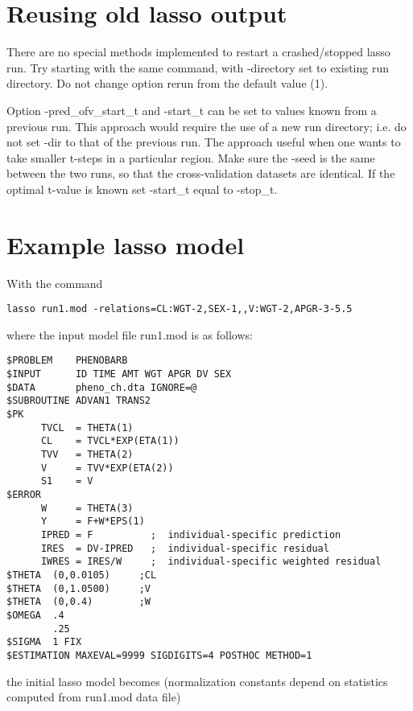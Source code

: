 \section{Reusing old lasso output}

There are no special methods implemented to restart a crashed/stopped lasso run. Try starting with the same command, with -directory set to existing run directory. Do not change option rerun from the default value (1).

Option -pred\_ofv\_start\_t and -start\_t can be set to values known from a previous run. This approach would require the use of a new run directory; i.e. do not set -dir to that of the previous run. The approach useful when one wants to take smaller t-steps in a particular region. Make sure the -seed is the same between the two runs, so that the cross-validation datasets are identical. If the optimal t-value is known set -start\_t equal to -stop\_t. 

\section{Example lasso model}

With the command
\begin{verbatim}
lasso run1.mod -relations=CL:WGT-2,SEX-1,,V:WGT-2,APGR-3-5.5
\end{verbatim}

where the input model file run1.mod is as follows:

\begin{verbatim}
$PROBLEM    PHENOBARB 
$INPUT      ID TIME AMT WGT APGR DV SEX
$DATA       pheno_ch.dta IGNORE=@
$SUBROUTINE ADVAN1 TRANS2
$PK
      TVCL  = THETA(1)
      CL    = TVCL*EXP(ETA(1))
      TVV   = THETA(2)
      V     = TVV*EXP(ETA(2))
      S1    = V
$ERROR      
      W     = THETA(3)
      Y     = F+W*EPS(1)
      IPRED = F          ;  individual-specific prediction
      IRES  = DV-IPRED   ;  individual-specific residual
      IWRES = IRES/W     ;  individual-specific weighted residual
$THETA  (0,0.0105)     ;CL
$THETA  (0,1.0500)     ;V
$THETA  (0,0.4)        ;W
$OMEGA  .4
        .25
$SIGMA  1 FIX
$ESTIMATION MAXEVAL=9999 SIGDIGITS=4 POSTHOC METHOD=1
\end{verbatim}

the initial lasso model becomes (normalization constants depend on statistics computed from run1.mod data file)

